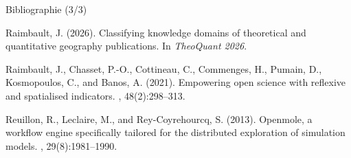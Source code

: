 \documentclass[english,10pt]{beamer}
\begin{document}
\begin{frame}{Bibliographie (3/3)}

\footnotesize

\begin{thebibliography}{}

Raimbault, J. (2026).
\newblock Classifying knowledge domains of theoretical and quantitative
  geography publications.
\newblock In {\em TheoQuant 2026}.

Raimbault, J., Chasset, P.-O., Cottineau, C., Commenges, H., Pumain, D.,
  Kosmopoulos, C., and Banos, A. (2021).
\newblock Empowering open science with reflexive and spatialised indicators.
,
  48(2):298--313.

Reuillon, R., Leclaire, M., and Rey-Coyrehourcq, S. (2013).
\newblock Openmole, a workflow engine specifically tailored for the distributed
  exploration of simulation models.
, 29(8):1981--1990.




\end{thebibliography}

\end{frame}
\end{document}
